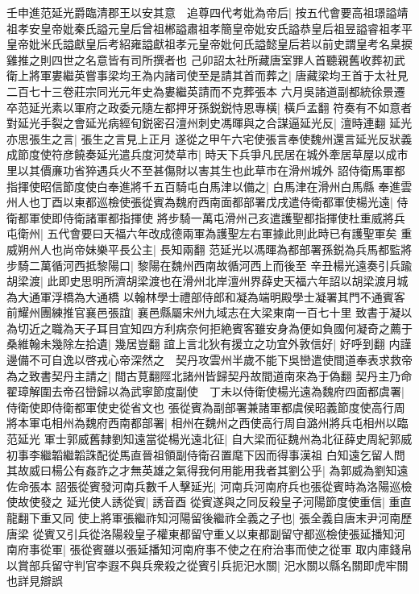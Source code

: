 壬申進范延光爵臨清郡王以安其意　追尊四代考妣為帝后|{
	按五代會要高祖璟謚靖祖孝安皇帝妣秦氏謚元皇后曾祖郴謚肅祖孝簡皇帝妣安氏謚恭皇后祖昱謚睿祖孝平皇帝妣米氏謚獻皇后考紹雍謚獻祖孝元皇帝妣何氏謚懿皇后若以前史謂皇考名臬捩雞推之則四世之名意皆有司所撰者也}
己卯詔太社所藏唐室罪人首聽親舊收葬初武衛上將軍婁繼英嘗事梁均王為内諸司使至是請其首而葬之|{
	唐藏梁均王首于太社見二百七十三卷莊宗同光元年史為婁繼英請而不克葬張本}
六月吳諸道副都統徐景遷卒范延光素以軍府之政委元隨左都押牙孫鋭鋭恃恩專橫|{
	橫戶孟翻}
符奏有不如意者對延光手裂之會延光病經旬鋭密召澶州刺史馮暉與之合謀逼延光反|{
	澶時連翻}
延光亦思張生之言|{
	張生之言見上正月}
遂從之甲午六宅使張言奉使魏州還言延光反狀義成節度使符彦饒奏延光遣兵度河焚草市|{
	時天下兵爭凡民居在城外牽居草屋以成市里以其價亷功省猝遇兵火不至甚傷財以害其生也此草市在滑州城外}
詔侍衛馬軍都指揮使昭信節度使白奉進將千五百騎屯白馬津以備之|{
	白馬津在滑州白馬縣}
奉進雲州人也丁酉以東都巡檢使張從賓為魏府西南面都部署戊戌遣侍衛都軍使楊光遠|{
	侍衛都軍使即侍衛諸軍都指揮使}
將步騎一萬屯滑州己亥遣護聖都指揮使杜重威將兵屯衛州|{
	五代會要曰天福六年改成德兩軍為護聖左右軍據此則此時已有護聖軍矣}
重威朔州人也尚帝妹樂平長公主|{
	長知兩翻}
范延光以馮暉為都部署孫鋭為兵馬都監將步騎二萬循河西抵黎陽口|{
	黎陽在魏州西南故循河西上而後至}
辛丑楊光遠奏引兵踰胡梁渡|{
	此即史思明所濟胡梁渡也在滑州北岸澶州界薛史天福六年詔以胡梁渡月城為大通軍浮橋為大通橋}
以翰林學士禮部侍郎和凝為端明殿學士凝署其門不通賓客前耀州團練推官襄邑張誼|{
	襄邑縣屬宋州九域志在大梁東南一百七十里}
致書于凝以為切近之職為天子耳目宜知四方利病奈何拒絶賓客雖安身為便如負國何凝奇之薦于桑維翰未幾除左拾遺|{
	幾居豈翻}
誼上言北狄有援立之功宜外敦信好|{
	好呼到翻}
内謹邊備不可自逸以啓戎心帝深然之　契丹攻雲州半歲不能下吳巒遣使間道奉表求救帝為之致書契丹主請之|{
	間古莧翻陘北諸州皆歸契丹故間道南來為于偽翻}
契丹主乃命翟璋解圍去帝召巒歸以為武寧節度副使　丁未以侍衛使楊光遠為魏府四面都虞署|{
	侍衛使即侍衛都軍使史從省文也}
張從賓為副部署兼諸軍都虞侯昭義節度使高行周將本軍屯相州為魏府西南都部署|{
	相州在魏州之西使高行周自潞州將兵屯相州以臨范延光}
軍士郭威舊隸劉知遠當從楊光遠北征|{
	自大梁而征魏州為北征薛史周紀郭威初事李繼韜繼韜誅配從馬直晉祖領副侍衛召置麾下因而得事漢祖}
白知遠乞留人問其故威曰楊公有姦詐之才無英雄之氣得我何用能用我者其劉公乎|{
	為郭威為劉知遠佐命張本}
詔張從賓發河南兵數千人擊延光|{
	河南兵河南府兵也張從賓時為洛陽巡檢使故使發之}
延光使人誘從賓|{
	誘音酉}
從賓遂與之同反殺皇子河陽節度使重信|{
	重直龍翻下重又同}
使上將軍張繼祚知河陽留後繼祚全義之子也|{
	張全義自唐末尹河南歷唐梁}
從賓又引兵從洛陽殺皇子權東都留守重乂以東都副留守都巡檢使張延播知河南府事從軍|{
	張從賓雖以張延播知河南府事不使之在府治事而使之從軍}
取内庫錢帛以賞部兵留守判官李遐不與兵衆殺之從賓引兵扼汜水關|{
	汜水關以縣名關即虎牢關也詳見辯誤}
